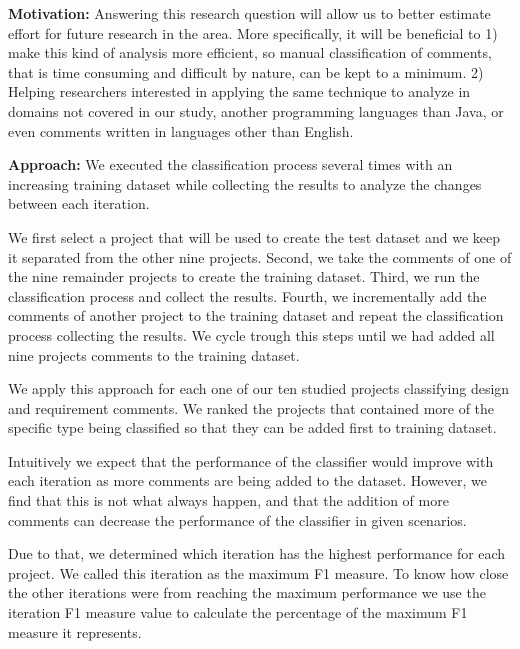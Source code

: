 \vspace{3mm}
\noindent\rqiii
\vspace{3mm}

\noindent \textbf{Motivation:} Answering this research question will allow us to better estimate effort for future research in the area. More specifically, it will be beneficial to 1) make this kind of analysis more efficient, so manual classification of comments, that is time consuming and difficult by nature, can be kept to a minimum. 2) Helping researchers interested in applying the same technique to analyze \SATD in domains not covered in our study, another programming languages than Java, or even comments written in languages other than English. 

\vspace{1mm}
\noindent \textbf{Approach:} We executed the classification process several times with an increasing training dataset while collecting the results to analyze the changes between each iteration. 

We first select a project that will be used to create the test dataset and we keep it separated from the other nine projects. Second, we take the comments of one of the nine remainder projects to create the training dataset. Third, we run the classification process and collect the results. Fourth, we incrementally add the comments of another project to the training dataset and repeat the classification process collecting the results. We cycle trough this steps until we had added all nine projects comments to the training dataset. 

We apply this approach for each one of our ten studied projects classifying design and requirement \SATD comments. We ranked the projects that contained more \SATD of the specific type being classified so that they can be added first to training dataset. 

Intuitively we expect that the performance of the classifier would improve with each iteration as more comments are being added to the dataset. However, we find that this is not what always happen, and that the addition of more comments can decrease the performance of the classifier in given scenarios.

Due to that, we determined which iteration has the highest performance for each project. We called this iteration as the maximum F1 measure. To know how close the other iterations were from reaching the maximum performance we use the iteration F1 measure value to calculate the percentage of the maximum F1 measure it represents.

